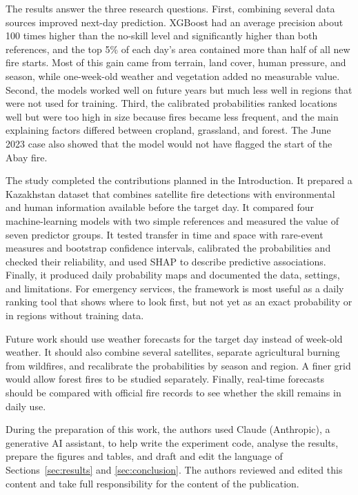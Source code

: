 The results answer the three research questions. First, combining several data sources improved next-day prediction. XGBoost had an average precision about 100 times higher than the no-skill level and significantly higher than both references, and the top 5\% of each day's area contained more than half of all new fire starts. Most of this gain came from terrain, land cover, human pressure, and season, while one-week-old weather and vegetation added no measurable value. Second, the models worked well on future years but much less well in regions that were not used for training. Third, the calibrated probabilities ranked locations well but were too high in size because fires became less frequent, and the main explaining factors differed between cropland, grassland, and forest. The June 2023 case also showed that the model would not have flagged the start of the Abay fire.

The study completed the contributions planned in the Introduction. It prepared a Kazakhstan dataset that combines satellite fire detections with environmental and human information available before the target day. It compared four machine-learning models with two simple references and measured the value of seven predictor groups. It tested transfer in time and space with rare-event measures and bootstrap confidence intervals, calibrated the probabilities and checked their reliability, and used SHAP to describe predictive associations. Finally, it produced daily probability maps and documented the data, settings, and limitations. For emergency services, the framework is most useful as a daily ranking tool that shows where to look first, but not yet as an exact probability or in regions without training data.

Future work should use weather forecasts for the target day instead of week-old weather. It should also combine several satellites, separate agricultural burning from wildfires, and recalibrate the probabilities by season and region. A finer grid would allow forest fires to be studied separately. Finally, real-time forecasts should be compared with official fire records to see whether the skill remains in daily use.

\backmatter

During the preparation of this work, the authors used Claude (Anthropic), a generative AI assistant, to help write the experiment code, analyse the results, prepare the figures and tables, and draft and edit the language of Sections~\ref{sec:results} and \ref{sec:conclusion}. The authors reviewed and edited this content and take full responsibility for the content of the publication.

